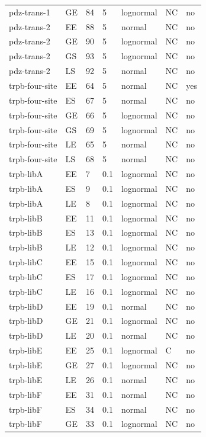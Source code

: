 \begin{longtable}[c]{lllllll}
pdz-trans-1 & GE & 84 & 5 & lognormal & NC & no \\
pdz-trans-2 & EE & 88 & 5 & normal & NC & no \\
pdz-trans-2 & GE & 90 & 5 & lognormal & NC & no \\
pdz-trans-2 & GS & 93 & 5 & lognormal & NC & no \\
pdz-trans-2 & LS & 92 & 5 & normal & NC & no \\
trpb-four-site & EE & 64 & 5 & normal & NC & yes \\
trpb-four-site & ES & 67 & 5 & normal & NC & no \\
trpb-four-site & GE & 66 & 5 & lognormal & NC & no \\
trpb-four-site & GS & 69 & 5 & lognormal & NC & no \\
trpb-four-site & LE & 65 & 5 & normal & NC & no \\
trpb-four-site & LS & 68 & 5 & normal & NC & no \\
trpb-libA & EE & 7 & 0.1 & lognormal & NC & no \\
trpb-libA & ES & 9 & 0.1 & lognormal & NC & no \\
trpb-libA & LE & 8 & 0.1 & lognormal & NC & no \\
trpb-libB & EE & 11 & 0.1 & lognormal & NC & no \\
trpb-libB & ES & 13 & 0.1 & lognormal & NC & no \\
trpb-libB & LE & 12 & 0.1 & lognormal & NC & no \\
trpb-libC & EE & 15 & 0.1 & lognormal & NC & no \\
trpb-libC & ES & 17 & 0.1 & lognormal & NC & no \\
trpb-libC & LE & 16 & 0.1 & lognormal & NC & no \\
trpb-libD & EE & 19 & 0.1 & normal & NC & no \\
trpb-libD & GE & 21 & 0.1 & lognormal & NC & no \\
trpb-libD & LE & 20 & 0.1 & normal & NC & no \\
trpb-libE & EE & 25 & 0.1 & lognormal & C & no \\
trpb-libE & GE & 27 & 0.1 & lognormal & NC & no \\
trpb-libE & LE & 26 & 0.1 & normal & NC & no \\
trpb-libF & EE & 31 & 0.1 & normal & NC & no \\
trpb-libF & ES & 34 & 0.1 & normal & NC & no \\
trpb-libF & GE & 33 & 0.1 & lognormal & NC & no \\

\end{longtable}
